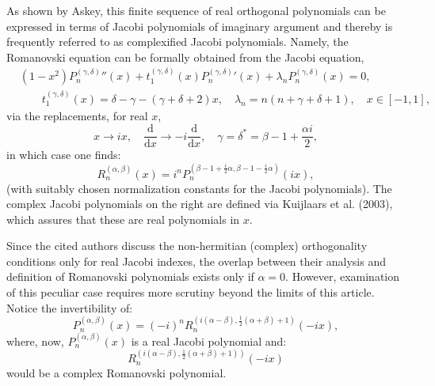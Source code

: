 \documentclass{article}
\begin{document}
As shown by Askey, this finite sequence of real orthogonal polynomials can be
expressed in terms of Jacobi polynomials of imaginary argument and thereby is
frequently referred to as complexified Jacobi polynomials.{\cite{Cotfas2004}}
Namely, the Romanovski equation can be formally obtained from the Jacobi
equation,{\cite{MathWorldJacobiDifferentialEquation}}
\begin{equation}
  \begin{aligned}
    & (1 - x^2) {P_n^{(\gamma, \delta)}}'' (x) + t^{(\gamma, \delta)}_1 (x)
    {P_n^{(\gamma, \delta)}}' (x) + \lambda_n P^{(\gamma, \delta)}_n (x) =
    0,\\
    & \qquad t^{(\gamma, \delta)}_1 (x) = \delta - \gamma - (\gamma + \delta
    + 2) x, \quad \lambda_n = n (n + \gamma + \delta + 1), \quad x \in [- 1,
    1],
  \end{aligned}
\end{equation}
via the replacements, for real $x$,
\begin{equation}
  x \to ix, \quad \frac{\mathrm{d}}{\mathrm{d} x} \to - i
  \frac{\mathrm{d}}{\mathrm{d} x}, \quad \gamma = \delta^{\ast} = \beta - 1 +
  \frac{\alpha i}{2},
\end{equation}
in which case one finds:
\begin{equation}
  R^{(\alpha, \beta)}_n (x) = i^n P^{\left( \beta - 1 + \frac{i}{2} \alpha,
  \beta - 1 - \frac{i}{2} \alpha \right)}_n  (ix),
\end{equation}
(with suitably chosen normalization constants for the Jacobi polynomials). The
complex Jacobi polynomials on the right are defined via Kuijlaars et al.
(2003),{\cite{Kuijlaars2005}} which assures that these are real polynomials in
$x$.

Since the cited authors discuss the non-hermitian (complex) orthogonality
conditions only for real Jacobi indexes, the overlap between their analysis
and definition of Romanovski polynomials exists only if $\alpha = 0$. However,
examination of this peculiar case requires more scrutiny beyond the limits of
this article. Notice the invertibility of:
\begin{equation}
  P^{(\alpha, \beta)}_n (x) = (- i)^n R^{\left( i (\alpha - \beta),
  \frac{1}{2} (\alpha + \beta) + 1 \right)}_n  (- ix),
\end{equation}
where, now, $P^{(\alpha, \beta)}_n (x)$ is a real Jacobi polynomial and:
\[ R^{\left. \left( i (\alpha - \beta), \frac{1}{2} (\alpha + \beta) + 1
   \right) \right)}_n  (- ix) \]
would be a complex Romanovski polynomial.
\end{document}
